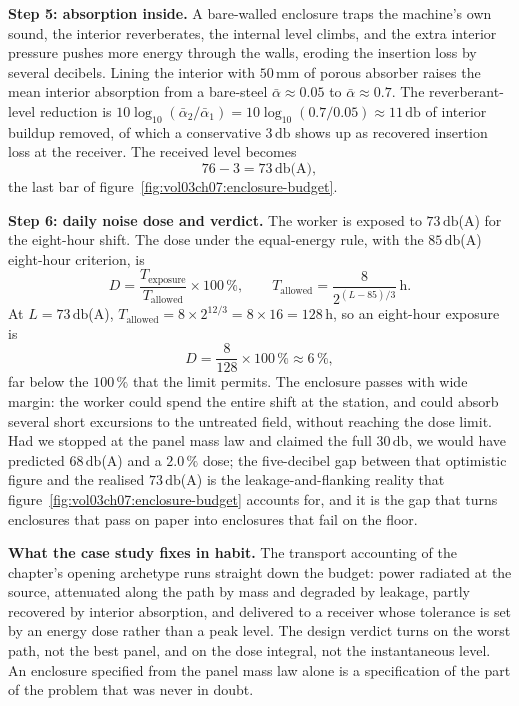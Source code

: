 \textbf{Step 5: absorption inside.} A bare-walled enclosure traps the
machine's own sound, the interior reverberates, the internal level
climbs, and the extra interior pressure pushes more energy through the
walls, eroding the insertion loss by several decibels. Lining the
interior with $50\,\si{\milli\meter}$ of porous absorber raises the mean
interior absorption from a bare-steel $\bar\alpha\approx 0.05$ to
$\bar\alpha\approx 0.7$. The reverberant-level reduction is
$10\log_{10}(\bar\alpha_2/\bar\alpha_1) = 10\log_{10}(0.7/0.05)\approx
11\,\si{\decibel}$ of interior buildup removed, of which a conservative
$3\,\si{\decibel}$ shows up as recovered insertion loss at the receiver.
The received level becomes
\[
76 - 3 = 73\,\si{\decibel}\text{(A)},
\]
the last bar of figure~\ref{fig:vol03ch07:enclosure-budget}.

\textbf{Step 6: daily noise dose and verdict.} The worker is exposed to
$73\,\si{\decibel}$(A) for the eight-hour shift. The dose under the
equal-energy rule, with the $85\,\si{\decibel}$(A) eight-hour criterion,
is
\[
D = \frac{T_{\text{exposure}}}{T_{\text{allowed}}}\times 100\,\%,
\qquad
T_{\text{allowed}} = \frac{8}{2^{(L-85)/3}}\,\text{h}.
\]
At $L=73\,\si{\decibel}$(A), $T_{\text{allowed}} = 8\times 2^{12/3} =
8\times 16 = 128\,\si{\hour}$, so an eight-hour exposure is
\[
D = \frac{8}{128}\times 100\,\% \approx 6\,\%,
\]
far below the $100\,\%$ that the limit permits. The enclosure passes
with wide margin: the worker could spend the entire shift at the
station, and could absorb several short excursions to the untreated
field, without reaching the dose limit. Had we stopped at the panel mass
law and claimed the full $30\,\si{\decibel}$, we would have predicted
$68\,\si{\decibel}$(A) and a $2.0\,\%$ dose; the five-decibel gap
between that optimistic figure and the realised $73\,\si{\decibel}$(A)
is the leakage-and-flanking reality that
figure~\ref{fig:vol03ch07:enclosure-budget} accounts for, and it is the
gap that turns enclosures that pass on paper into enclosures that fail
on the floor.





\textbf{What the case study fixes in habit.} The transport accounting
of the chapter's opening archetype runs straight down the budget: power
radiated at the source, attenuated along the path by mass and degraded
by leakage, partly recovered by interior absorption, and delivered to a
receiver whose tolerance is set by an energy dose rather than a peak
level. The design verdict turns on the worst path, not the best panel,
and on the dose integral, not the instantaneous level. An enclosure
specified from the panel mass law alone is a specification of the part
of the problem that was never in doubt.

